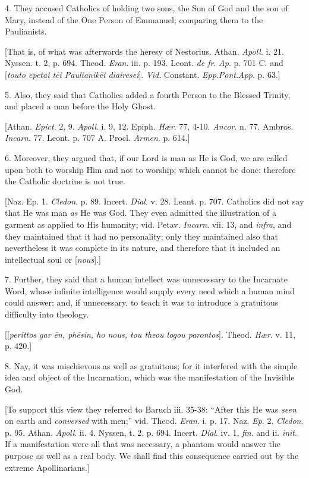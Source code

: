 4. They accused Catholics of holding two sons, the Son of God and
the son of Mary, instead of the One Person of Emmanuel; comparing them
to the Paulianists.

[That is, of what was afterwards the heresy of Nestorius. Athan. \emph{Apoll}.
i. 21. Nyssen. t. 2, p. 694. Theod. \emph{Eran}. iii. p. 193. Leont. \emph{de
fr}. \emph{Ap}. p. 701 C. and [\emph{touto epetai t\={e}i Paulianik\={e}i
diairesei}]. \emph{Vid}. Constant. \emph{Epp}.\emph{Pont}.\emph{App}.
p. 63.]

5. Also, they said that Catholics added a fourth Person to the
Blessed Trinity, and placed a man before the Holy Ghost.

[Athan. \emph{Epict}. 2, 9. \emph{Apoll}. i. 9, 12. Epiph. \emph{Hær}.
77, 4-10. \emph{Ancor}. n. 77. Ambros. \emph{Incarn}. 77. Leont. p.
707 A. Procl. \emph{Armen}. p. 614.]

6. Moreover, they argued that, if our Lord is man as He is God, we
are called upon both to worship Him and not to worship; which cannot
be done: therefore the Catholic doctrine is not true.

[Naz. Ep. 1. \emph{Cledon}. p. 89. Incert. \emph{Dial}. v. 28.
Leant. p. 707. Catholics did not say that He was man \emph{as} He was
God. They even admitted the illustration of a garment as applied to
His humanity; vid. Petav. \emph{Incarn}. vii. 13, and \emph{infra},
and they maintained that it had no personality; only they maintained
also that nevertheless it was complete in its nature, and therefore
that it included an intellectual soul or [\emph{nous}].]

7. Further, they said that a human intellect was unnecessary to the
Incarnate Word, whose infinite intelligence would supply every need
which a human mind could answer; and, if unnecessary, to teach it was
to introduce a gratuitous difficulty into theology.

[[\emph{perittos gar \={e}n, ph\={e}sin, ho nous, tou theou
logou parontos}]. Theod. \emph{Hær}. v. 11, p. 420.]

8. Nay, it was mischievous as well as gratuitous; for it interfered
with the simple idea and object of the Incarnation, which was the
manifestation of the Invisible God.

[To support this view they referred to Baruch iii. 35-38:
``After this He was \emph{seen} on earth and \emph{conversed} with
men;'' vid. Theod. \emph{Eran}. i. p. 17. Naz.
\emph{Ep}. 2. \emph{Cledon}. p. 95. Athan. \emph{Apoll}. ii. 4. Nyssen,
t. 2, p. 694. Incert. \emph{Dial}. iv. 1, \emph{fin}. and ii. \emph{init}.
If a manifestation were all that was necessary, a phantom would answer
the purpose as well as a real body. We shall find this consequence
carried out by the extreme Apollinarians.]

